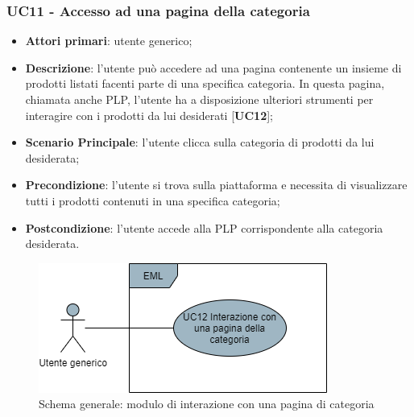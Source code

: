\subsubsection{UC11 - Accesso ad una pagina della categoria}
\begin{itemize}
\item \textbf{Attori primari}: utente generico;
\item \textbf{Descrizione}: l'utente può accedere ad una pagina contenente un insieme di prodotti listati facenti parte di una specifica categoria. In questa pagina, chiamata anche PLP, l'utente ha a disposizione ulteriori strumenti per interagire con i prodotti da lui desiderati [\textbf{UC12}];
\item \textbf{Scenario Principale}: l'utente clicca sulla categoria di prodotti da lui desiderata;
\item \textbf{Precondizione}: l'utente si trova sulla piattaforma e necessita di visualizzare tutti i prodotti contenuti in una specifica categoria;
\item \textbf{Postcondizione}: l'utente accede alla PLP corrispondente alla categoria desiderata.
\end{itemize}
\begin{figure}[H]
\centering
\includegraphics[scale=0.6]{res/UseCase/Immagini/InterazionePaginaCategoriaGenerale}
\caption{Schema generale: modulo di interazione con una pagina di categoria}
\end{figure}